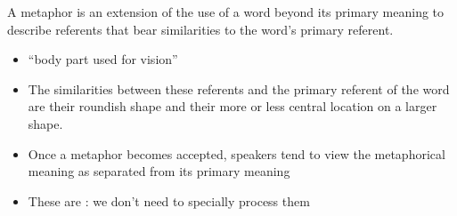 \documentclass[a4paper,landscape,headrule,footrule,xetex]{foils}
\begin{document}
A metaphor is an extension of the use of a word beyond its
primary meaning to describe referents that bear similarities to
the word's primary referent.
\begin{itemize}
\item {} ``body part used for vision''
  \begin{exe}
  \ex {} 
  \ex {}
  \ex {} 
  \end{exe}
\item The similarities between these referents and the primary referent of
the word  are their roundish shape and their more or less central
location on a larger shape.
\end{itemize}

\begin{itemize}
\item Once a metaphor becomes accepted, speakers tend to view the
metaphorical meaning as separated from its primary meaning

\begin{exe}
  \ex {}
  \ex {}
  \ex {}
  \ex {}
  \ex {}
\end{exe}
\item These are : we don't need to specially process them
\end{itemize}

\end{document}
